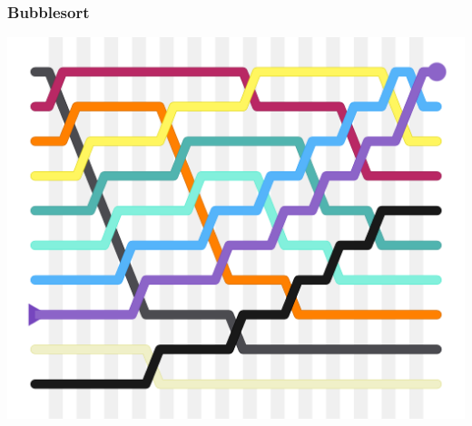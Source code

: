 % 
% 
% 
% 
% 
% 
% 

\begin{frame}[fragile]

    \frametitle{Bubblesort}
 \begin{center}
 \includegraphics[scale=0.4]{images/Bubblesort-edited-color.svg.png}
 \end{center}

\end{frame}

